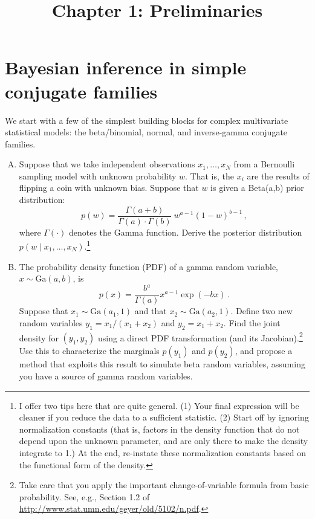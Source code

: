 \documentclass{mynotes}
\title[Chapter 1 $\cdot$ SSC 384D]{Chapter 1: Preliminaries}
\date{}  %
\begin{document}
\maketitle%

\section{Bayesian inference in simple conjugate families}

We start with a few of the simplest building blocks for complex multivariate statistical models: the beta/binomial, normal, and inverse-gamma conjugate families.

\begin{enumerate}[(A)]

\item Suppose that we take independent observations $x_1, \ldots, x_N$ from a Bernoulli sampling model with unknown probability $w$.  That is, the $x_i$ are the results of flipping a coin with unknown bias.  Suppose that $w$ is given a Beta(a,b) prior distribution:
$$
p(w) = \frac{\Gamma(a+b)}{\Gamma(a) \cdot \Gamma(b)} \ w^{a-1} (1-w)^{b-1} \, ,
$$
where $\Gamma(\cdot)$ denotes the Gamma function.  Derive the posterior distribution $p(w \mid x_1, \ldots, x_N)$.\footnote{I offer two tips here that are quite general.  (1) Your final expression will be cleaner if you reduce the data to a sufficient statistic.  (2) Start off by ignoring normalization constants (that is, factors in the density function that do not depend upon the unknown parameter, and are only there to make the density integrate to 1.)  At the end, re-instate these normalization constants based on the functional form of the density.}

\item The probability density function (PDF) of a gamma random variable, $x \sim \mbox{Ga}(a,b)$, is
$$
p(x) = \frac{b^a}{\Gamma(a)} x^{a-1} \exp(-bx) \, .
$$
Suppose that $x_1 \sim \mbox{Ga}(a_1,1)$ and that $x_2 \sim \mbox{Ga}(a_2,1)$.  Define two new random variables $y_1 = x_1/(x_1 + x_2)$ and $y_2 = x_1 + x_2$.  Find the joint density for $(y_1, y_2)$ using a direct PDF transformation (and its Jacobian).\footnote{Take care that you apply the important change-of-variable formula from basic probability.  See, e.g., Section 1.2 of \url{http://www.stat.umn.edu/geyer/old/5102/n.pdf}.}  Use this to characterize the  marginals $p(y_1)$ and $p(y_2)$, and propose a method that exploits this result to simulate beta random variables, assuming you have a source of gamma random variables.


\end{enumerate}
\end{document}
